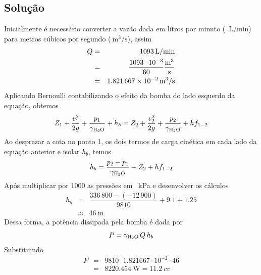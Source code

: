 \documentclass[a4paper, 12pt, brazilian]{article}
\begin{document}
	\subsection{Solução}
	Inicialmente é necessário converter a vazão dada em litros por minuto (\SI{}{\liter/\minute}) para metros cúbicos por segundo ($\SI{}{\meter^{3}/\second}$), assim
	\begin{eqnarray}
		Q&=&\SI{1093}{\liter/\minute}\\
		 &=&\dfrac{1093\cdot 10^{-3}}{60}\SI{}{\dfrac{\meter^{3}}{\second}}\\
		 &=&\SI{1.821667e-2}{\meter^{3}/\second}
	\end{eqnarray}
	Aplicando Bernoulli contabilizando o efeito da bomba do lado esquerdo da equação, obtemos
	\begin{equation}
		Z_{1}+\dfrac{v_{1}^{2}}{2g}+\dfrac{p_{1}}{\gamma_{\ce{H2O}}}+h_{b}=Z_{2}+\dfrac{v_{2}^{2}}{2g}+\dfrac{p_{2}}{\gamma_{\ce{H2O}}}+hf_{1-2}\\
	\end{equation}
	Ao desprezar a cota no ponto 1, os dois termos de carga cinética em cada lado da equação anterior e isolar $h_{b}$, temos
	\begin{equation}
		h_{b}=\dfrac{p_{2}-p_{1}}{\gamma_{\ce{H2O}}}+Z_{2}+hf_{1-2}
	\end{equation}
	Após multiplicar por 1000 as pressões em \SI{}{\kilo\pascal} e desenvolver os cálculos
	\begin{eqnarray}
		h_{b}&=&\dfrac{336\,800-(-12\,900)}{9810}+9.1+1.25\\
			 &\approx&\SI{46}{\meter}
	\end{eqnarray}
	Dessa forma, a potência dissipada pela bomba é dada por
	\begin{equation}
		P=\gamma_{\ce{H2O}}\,Q\,h_{b}
	\end{equation}
	Substituindo
	\begin{eqnarray}
		P&=&9810\cdot 1.821667\cdot 10^{-2}\cdot 46\\
		 &=&\SI{8220.454}{\watt}=\SI{11.2}{cv}
	\end{eqnarray}
\end{document}
